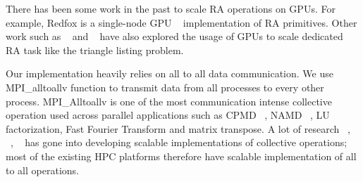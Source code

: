 There has been some work in the past to scale RA operations on GPUs. For example,
Redfox is a single-node GPU ~\cite{Wu:2014:RFE:2581122.2544166} implementation of RA primitives. Other work such as ~\cite{Martinez-Angeles:2016:RLG:2932241.2932244} and ~\cite{Zinn:2016:GJA:2884045.2884054} have also explored the usage of GPUs to scale dedicated RA task like the triangle listing problem.

Our implementation heavily relies on all to all data communication. We use MPI\_alltoallv function to transmit data from all processes to every other process.
MPI\_Alltoallv is one of the most communication intense collective operation used across parallel applications such as 
CPMD ~\cite{cpmd-web}, NAMD ~\cite{1592872}, LU factorization, Fast Fourier Transform and matrix transpose.
A lot of research ~\cite{4536141}, ~\cite{642949}, ~\cite{Thakur:2005:OCC:2747766.2747771} has gone into developing scalable implementations of collective operations; most of the existing HPC platforms therefore have scalable implementation of all to all operations. 




